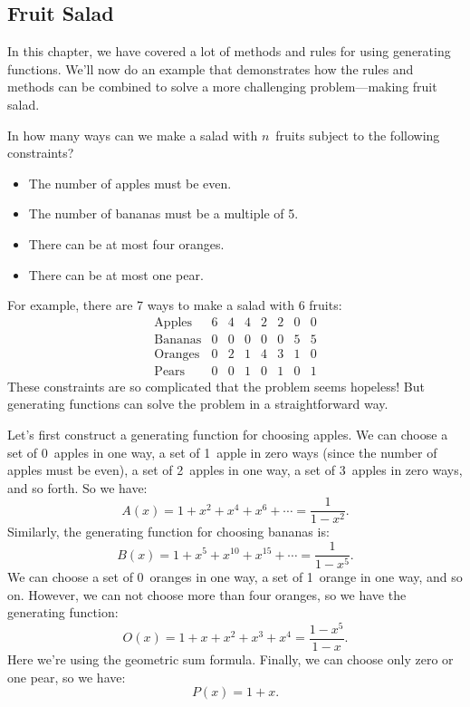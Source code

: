 \subsection{Fruit Salad}


In this chapter, we have covered a lot of methods and rules for using
generating functions.  We'll now do an example that demonstrates how
the rules and methods can be combined to solve a more challenging
problem---making fruit salad.

In how many ways can we make a salad with $n$~fruits subject to the
following constraints?
\begin{itemize}
\item The number of apples must be even.
\item The number of bananas must be a multiple of 5.
\item There can be at most four oranges.
\item There can be at most one pear.
\end{itemize}

For example, there are 7 ways to make a salad with 6 fruits:
%
\[
\begin{array}{c|ccccccc}
\text{Apples}  & 6 & 4 & 4 & 2 & 2 & 0 & 0 \\
\text{Bananas} & 0 & 0 & 0 & 0 & 0 & 5 & 5 \\
\text{Oranges} & 0 & 2 & 1 & 4 & 3 & 1 & 0 \\
\text{Pears}   & 0 & 0 & 1 & 0 & 1 & 0 & 1
\end{array}
\]
%
These constraints are so complicated that the problem seems hopeless!
But generating functions can solve the problem in a straightforward
way.

Let's first construct a generating function for choosing apples.  We
can choose a set of 0~apples in one way, a set of 1~apple in zero
ways (since the number of apples must be even), a set of 2~apples in
one way, a set of 3~apples in zero ways, and so forth.  So we have:
%
\[
    A(x) = 1 + x^2 + x^4 + x^6 + \cdots = \frac{1}{1 - x^2}.
\]
%
Similarly, the generating function for choosing bananas is:
%
\[
    B(x) = 1 + x^5 + x^{10} + x^{15} + \cdots = \frac{1}{1 - x^5}.
\]
We can choose a set of 0~oranges in one way, a set of 1~orange in
one way, and so on.  However, we can not choose more than four
oranges, so we have the generating function:
%
\[
    O(x) = 1 + x + x^2 + x^3 + x^4 = \frac{1-x^5}{1-x}.
\]
%
Here we're using the geometric sum formula.  Finally, we can choose
only zero or one pear, so we have:
%
\[
    P(x) = 1 + x.
\]

